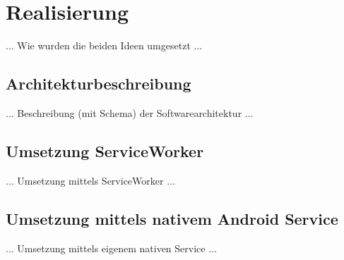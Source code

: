 \section{Realisierung}

... Wie wurden die beiden Ideen umgesetzt ...

\subsection{Architekturbeschreibung}

... Beschreibung (mit Schema) der Softwarearchitektur ...


\subsection{Umsetzung ServiceWorker}

... Umsetzung mittels ServiceWorker ...

\subsection{Umsetzung mittels nativem Android Service}

... Umsetzung mittels eigenem nativen Service ...